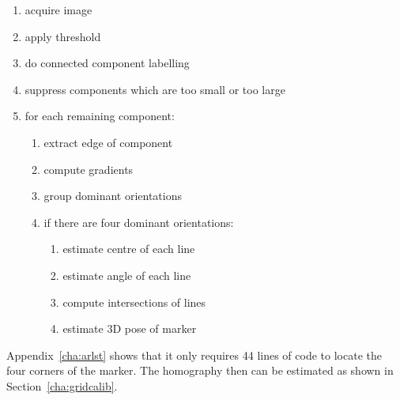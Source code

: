 \documentclass[12pt,a4paper,oneside,openright]{book}
\newcommand{\sct}[1]{Section~\ref{cha:#1}}
\newcommand{\anx}[1]{Appendix~\ref{cha:#1}}
\begin{document}
\begin{CJK}{UTF8}{}
\begin{enumerate}
\item acquire image
\item apply threshold
\item do connected component labelling
\item suppress components which are too small or too large
\item for each remaining component:
  \begin{enumerate}
  \item extract edge of component
  \item compute gradients
  \item group dominant orientations
  \item if there are four dominant orientations:
    \begin{enumerate}
    \item estimate centre of each line
    \item estimate angle of each line
    \item compute intersections of lines
    \item estimate 3D pose of marker
    \end{enumerate}
  \end{enumerate}
\end{enumerate}
\anx{arlst} shows that it only requires 44 lines of code to locate the four corners of the marker. The homography then can be estimated as shown in \sct{gridcalib}.


\end{CJK}
\end{document}

